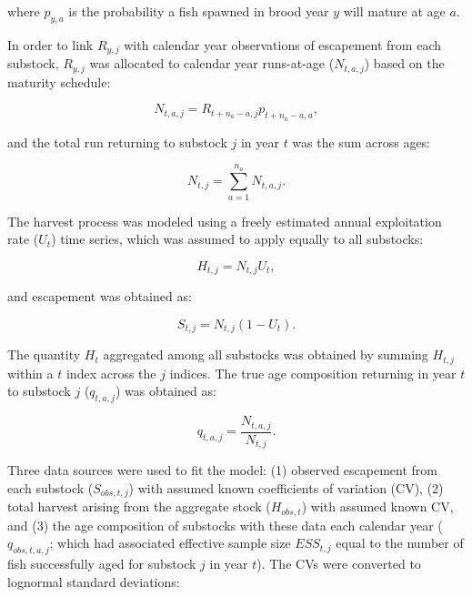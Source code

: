 \documentclass[12pt,]{book}
\theoremstyle{definition}
\theoremstyle{definition}
\theoremstyle{definition}
\theoremstyle{remark}
\begin{document}
\noindent
where \(p_{y,a}\) is the probability a fish spawned in brood year \(y\)
will mature at age \(a\).

In order to link \(R_{y,j}\) with calendar year observations of
escapement from each substock, \(R_{y,j}\) was allocated to calendar
year runs-at-age (\(N_{t,a,j}\)) based on the maturity schedule:

\begin{equation}
  N_{t,a,j} = R_{t+n_a-a,j} p_{t+n_a-a,a},
  \label{eq:tsm-get-N-ta}
\end{equation}

\noindent
and the total run returning to substock \(j\) in year \(t\) was the sum
across ages:

\begin{equation}
  N_{t,j}=\sum_{a=1}^{n_a} N_{t,a,j}.
  \label{eq:tsm-get-N}
\end{equation}

\noindent
The harvest process was modeled using a freely estimated annual
exploitation rate (\(U_t\)) time series, which was assumed to apply
equally to all substocks:

\begin{equation}
  H_{t,j}=N_{t,j} U_t,
  \label{eq:tsm-get-H}
\end{equation}

\noindent
and escapement was obtained as:

\begin{equation}
  S_{t,j}=N_{t,j} (1 - U_t).
  \label{eq:tsm-get-S}
\end{equation}

The quantity \(H_t\) aggregated among all substocks was obtained by
summing \(H_{t,j}\) within a \(t\) index across the \(j\) indices. The
true age composition returning in year \(t\) to substock \(j\)
(\(q_{t,a,j}\)) was obtained as:

\begin{equation}
  q_{t,a,j} = \frac{N_{t,a,j}}{N_{t,j}}.
  \label{eq:get-q}
\end{equation}

Three data sources were used to fit the model: (1) observed escapement
from each substock (\(S_{obs,t,j}\)) with assumed known coefficients of
variation (CV), (2) total harvest arising from the aggregate stock
(\(H_{obs,t}\)) with assumed known CV, and (3) the age composition of
substocks with these data each calendar year (\(q_{obs,t,a,j}\); which
had associated effective sample size \(ESS_{t,j}\) equal to the number
of fish successfully aged for substock \(j\) in year \(t\)). The CVs
were converted to lognormal standard deviations:
\end{document}
